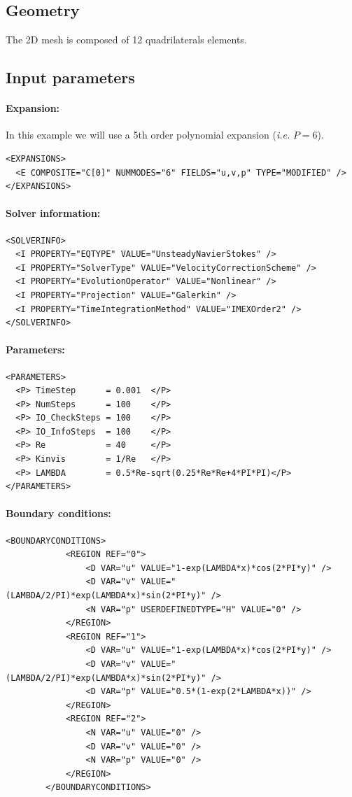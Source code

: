 \subsection{Geometry}
The 2D mesh is composed of 12 quadrilaterals elements.

\subsection{Input parameters}

\paragraph{Expansion:~}
In this example we will use a 5th order polynomial expansion (\textit{i.e.} $P=6$).
\begin{lstlisting}[style=XMLStyle]
<EXPANSIONS>
  <E COMPOSITE="C[0]" NUMMODES="6" FIELDS="u,v,p" TYPE="MODIFIED" />
</EXPANSIONS>
\end{lstlisting}

\paragraph{Solver information:~}
\begin{lstlisting}[style=XMLStyle]
<SOLVERINFO>
  <I PROPERTY="EQTYPE" VALUE="UnsteadyNavierStokes" />
  <I PROPERTY="SolverType" VALUE="VelocityCorrectionScheme" />
  <I PROPERTY="EvolutionOperator" VALUE="Nonlinear" />
  <I PROPERTY="Projection" VALUE="Galerkin" />
  <I PROPERTY="TimeIntegrationMethod" VALUE="IMEXOrder2" />
</SOLVERINFO>
\end{lstlisting}

\paragraph{Parameters:~}
\begin{lstlisting}[style=XMLStyle]
<PARAMETERS>
  <P> TimeStep      = 0.001  </P>
  <P> NumSteps      = 100    </P>
  <P> IO_CheckSteps = 100    </P>
  <P> IO_InfoSteps  = 100    </P>
  <P> Re            = 40     </P>
  <P> Kinvis        = 1/Re   </P>
  <P> LAMBDA        = 0.5*Re-sqrt(0.25*Re*Re+4*PI*PI)</P>
</PARAMETERS>
\end{lstlisting}

\paragraph{Boundary conditions:~}
\begin{lstlisting}[style=XMLStyle]
  		<BOUNDARYCONDITIONS>
    		<REGION REF="0">
      			<D VAR="u" VALUE="1-exp(LAMBDA*x)*cos(2*PI*y)" />
      			<D VAR="v" VALUE="(LAMBDA/2/PI)*exp(LAMBDA*x)*sin(2*PI*y)" />
      			<N VAR="p" USERDEFINEDTYPE="H" VALUE="0" />
    		</REGION>
    		<REGION REF="1">
      			<D VAR="u" VALUE="1-exp(LAMBDA*x)*cos(2*PI*y)" />
      			<D VAR="v" VALUE="(LAMBDA/2/PI)*exp(LAMBDA*x)*sin(2*PI*y)" />
      			<D VAR="p" VALUE="0.5*(1-exp(2*LAMBDA*x))" />
    		</REGION>
    		<REGION REF="2">
      			<N VAR="u" VALUE="0" />
      			<D VAR="v" VALUE="0" />
      			<N VAR="p" VALUE="0" />
    		</REGION>
  		</BOUNDARYCONDITIONS>
\end{lstlisting}

